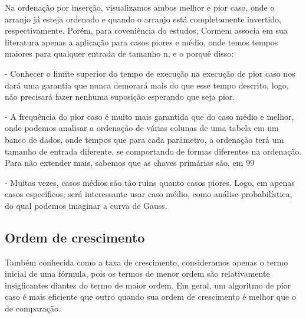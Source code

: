 Na ordenação por inserção, visualizamos ambos melhor e pior caso, onde o arranjo já esteja ordenado e quando o arranjo está completamente invertido, respectivamente. Porém, para coveniência do estudos, Cormem associa em sua literatura apenas a aplicação para casos piores e médio, onde temos tempos maiores para qualquer entrada de tamanho n, e o porquê disso:

- Conhecer o limite superior do tempo de execução na execução de pior caso nos dará uma garantia que nunca demorará mais do que esse tempo descrito, logo, não precisará fazer nenhuma suposição esperando que seja pior.

- A frequência do pior caso é muito mais garantida que do caso médio e melhor, onde podemos analisar a ordenação de várias colunas de uma tabela em um banco de dados, onde tempos que para cada parâmetro, a ordenação terá um tamanho de entrada diferente, se comportando de formas diferentes na ordenação. Para não extender mais, sabemos que as chaves primárias são, em 99%

- Muitas vezes, casos médios são tão ruins quanto casos piores. Logo, em apenas casos específicos, será interessante usar caso médio, como análise probabilística, do qual podemos imaginar a curva de Gauss.

\subsection{Ordem de crescimento}

Também conhecida como a taxa de crescimento, consideramos apenas o termo inicial de uma fórmula, pois os termos de menor ordem são relativamente insigficantes diantes do termo de maior ordem. Em geral, um algoritmo de pior caso é mais eficiente que outro quando sua ordem de crescimento é melhor que o de comparação. 
